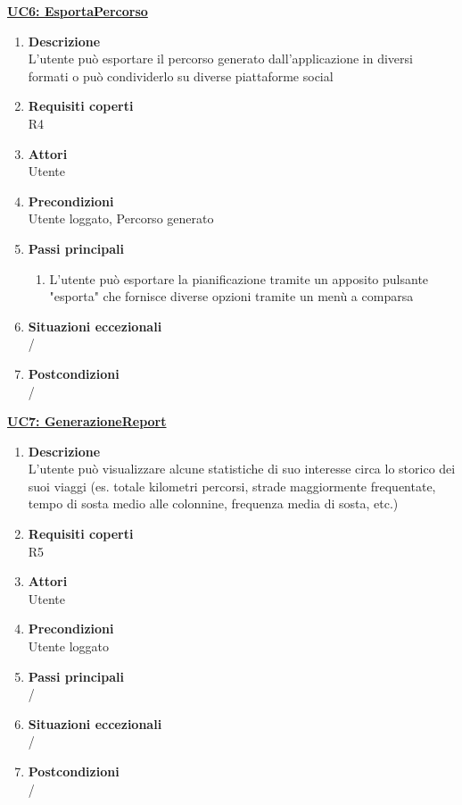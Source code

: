 \underline{\textbf{UC6: EsportaPercorso}}

\begin{enumerate}
\item\textbf{Descrizione}\\
L'utente può esportare il percorso generato dall'applicazione in diversi formati o può condividerlo su diverse piattaforme social
\item\textbf{Requisiti coperti}\\
R4
\item\textbf{Attori}\\
Utente
\item\textbf{Precondizioni}\\
Utente loggato, Percorso generato
\item\textbf{Passi principali}
\begin{enumerate}
    \item L'utente può esportare la pianificazione tramite un apposito pulsante "esporta" che fornisce diverse opzioni tramite un menù a comparsa
\end{enumerate}
\item\textbf{Situazioni eccezionali}\\ /
\item\textbf{Postcondizioni}\\ /
\end{enumerate}

\underline{\textbf{UC7: GenerazioneReport}}

\begin{enumerate}
\item\textbf{Descrizione}\\
L'utente può visualizzare alcune statistiche di suo interesse circa lo storico dei suoi viaggi (es. totale kilometri percorsi, strade maggiormente frequentate, tempo di sosta medio alle colonnine, frequenza media di sosta, etc.)
\item\textbf{Requisiti coperti}\\
R5
\item\textbf{Attori}\\
Utente
\item\textbf{Precondizioni}\\ Utente loggato
\item\textbf{Passi principali}\\ /
\item\textbf{Situazioni eccezionali}\\ /
\item\textbf{Postcondizioni}\\
/
\end{enumerate}

